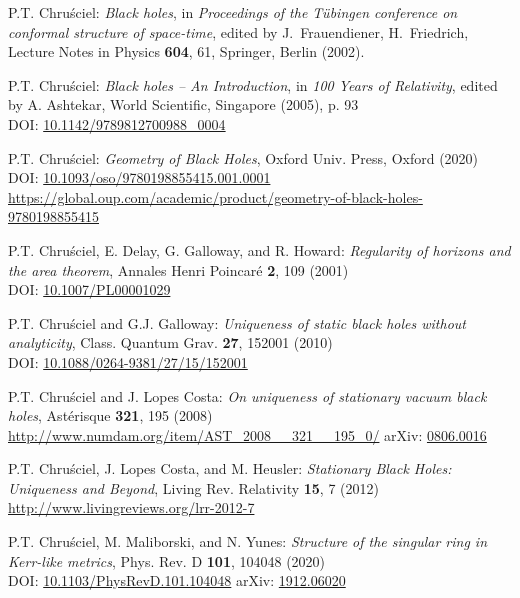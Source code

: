 \begin{thebibliography}{123}
P.T. Chru\'sciel: {\em Black holes},
in {\em Proceedings of the T\"ubingen conference on conformal structure of
space-time}, edited by J.~Frauendiener, H.~Friedrich,
Lecture Notes in Physics {\bf 604}, 61,
Springer, Berlin (2002).

P.T. Chru\'sciel: {\em Black holes -- An Introduction},
in {\em 100 Years of Relativity}, edited by A. Ashtekar,
World Scientific, Singapore (2005), p. 93\\
DOI: \href{https://doi.org/10.1142/9789812700988_0004}{10.1142/9789812700988\_0004}

P.T. Chru\'sciel: {\em Geometry of Black Holes},
Oxford Univ. Press, Oxford (2020)\\
DOI: \href{https://doi.org/10.1093/oso/9780198855415.001.0001}{10.1093/oso/9780198855415.001.0001}\\
{\footnotesize \url{https://global.oup.com/academic/product/geometry-of-black-holes-9780198855415}}

P.T. Chru\'sciel, E. Delay, G. Galloway, and R. Howard:
{\em Regularity of horizons and the area theorem},
Annales Henri Poincar\'e {\bf 2}, 109 (2001)\\
DOI: \href{https://doi.org/10.1007/PL00001029}{10.1007/PL00001029}

P.T. Chru\'sciel and G.J. Galloway:
{\em Uniqueness of static black holes without analyticity},
Class. Quantum Grav. {\bf 27}, 152001 (2010)\\
DOI: \href{https://doi.org/10.1088/0264-9381/27/15/152001}{10.1088/0264-9381/27/15/152001}

P.T. Chru\'sciel and J. Lopes Costa:
{\em On uniqueness of stationary vacuum black holes},
Astérisque {\bf 321}, 195 (2008)\\
\url{http://www.numdam.org/item/AST_2008__321__195_0/}\hfill
arXiv: \href{https://arxiv.org/abs/0806.0016}{0806.0016}

P.T. Chru\'sciel, J. Lopes Costa, and M. Heusler:
{\em Stationary Black Holes: Uniqueness and Beyond},
Living Rev. Relativity {\bf 15}, 7 (2012) \\
\url{http://www.livingreviews.org/lrr-2012-7}

P.T. Chru\'sciel, M. Maliborski, and N. Yunes:
{\em Structure of the singular ring in Kerr-like metrics},
Phys. Rev. D {\bf 101}, 104048 (2020)\\
DOI: \href{https://doi.org/10.1103/PhysRevD.101.104048}{10.1103/PhysRevD.101.104048}\hfill
arXiv: \href{https://arxiv.org/abs/1912.06020}{1912.06020}


\end{thebibliography}
